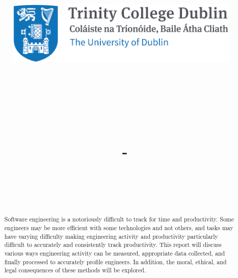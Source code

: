 \documentclass{article}
\title{
    \vspace{-1in}
    \begin{figure}[!ht]
    \flushleft
    \includegraphics[width=0.4\linewidth]{reduced-trinity.png}
    \end{figure}
    \vspace{-0.5cm}
    \hrulefill \\
    \vspace{1cm}
    \textmd{\textbf{\moduleCode\ \moduleName}}\\
    \textmd{\textbf{\assignmentTitle}}\\
    \textmd{\authorName\ - \authorID}\\
    \textmd{\reportDate}\\
    \vspace{0.5cm}
    \hrulefill \\
}
\date{}
\author{}
\begin{document}
    \lstset{language=bash, float=h, captionpos=b, frame=single, numbers=left, numberblanklines=false, numberstyle=\tiny, numbersep=1mm, framexleftmargin=3mm, xleftmargin=5mm, aboveskip=3mm, breaklines=true}
    \captionsetup{width=.8\linewidth}
    
    \maketitle
    \tableofcontents
    \newpage
    
    \begin{abstract}
        Software engineering is a notoriously difficult to track for time and productivity. Some engineers may be more efficient with some technologies and not others, and tasks may have varying difficulty making engineering activity and productivity particularly difficult to accurately and consistently track productivity. This report will discuss various ways engineering activity can be measured, appropriate data collected, and finally processed to accurately profile engineers. In addition, the moral, ethical, and legal consequences of these methods will be explored.
    \end{abstract}
\end{document}
